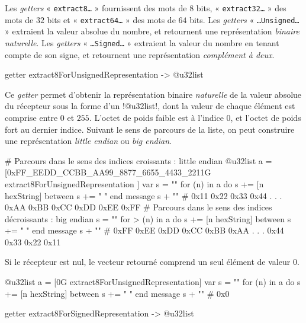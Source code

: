 Les \emph{getters} « \texttt{extract8…} » fournissent des mots de $8$ bits, « \texttt{extract32…} »  des mots de $32$ bits et « \texttt{extract64…} »  des mots de $64$ bits. Les \emph{getters} « \texttt{…Unsigned…} » extraient la valeur absolue du nombre, et retournent une représentation \emph{binaire naturelle}. Les \emph{getters} « \texttt{…Signed…} » extraient la valeur du nombre en tenant compte de son signe, et retournent une représentation \emph{complément à deux}.


\begin{galgas4box}
getter extract8ForUnsignedRepresentation -> @u32list
\end{galgas4box}

Ce \emph{getter} permet d'obtenir la représentation binaire \emph{naturelle} de la valeur absolue du récepteur sous la forme d'un \ggsq!@u32list!, dont la valeur de chaque élément est comprise entre $0$ et $255$. L'octet de poids faible est à l'indice $0$, et l'octet de poids fort au dernier indice. Suivant le sens de parcours de la liste, on peut construire une représentation \emph{little endian} ou \emph{big endian}.

\begin{galgas4}
# Parcours dans le sens des indices croissants : little endian
@u32list a = [0xFF_EEDD_CCBB_AA99_8877_6655_4433_2211G
  extract8ForUnsignedRepresentation
]
var s = ""
for (n) in a
  do s += [n hexString]
  between s += " "
end
message s + "\n" # 0x11 0x22 0x33 0x44 . . . 0xAA 0xBB 0xCC 0xDD 0xEE 0xFF
# Parcours dans le sens des indices décroissants : big endian
s = ""
for > (n) in a
  do s += [n hexString]
  between s += " "
end
message s + "\n" # 0xFF 0xEE 0xDD 0xCC 0xBB 0xAA . . . 0x44 0x33 0x22 0x11
\end{galgas4}

Si le récepteur est nul, le vecteur retourné comprend un seul élément de valeur $0$.

\begin{galgas4}
@u32list a = [0G extract8ForUnsignedRepresentation]
var s = ""
for (n) in a
  do s += [n hexString]
  between s += " "
end
message s + "\n" # 0x0
\end{galgas4}


\begin{galgas4box}
getter extract8ForSignedRepresentation -> @u32list
\end{galgas4box}

